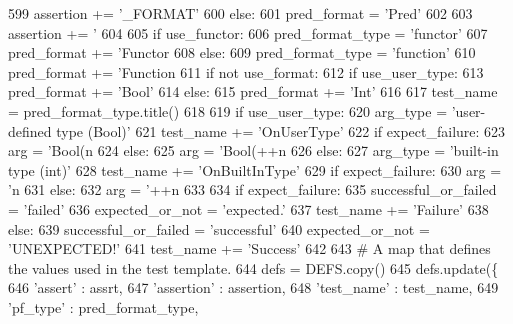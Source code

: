 \begin{DoxyCode}
{{{{{{{{{{{{{{{{{{{{{{{{{{{{{{{{{{{{{{{{{{{{{{{{{599       assertion += \textcolor{stringliteral}{'\_FORMAT'}
600     \textcolor{keywordflow}{else}:
601       pred\_format = \textcolor{stringliteral}{'Pred'}
602 
603     assertion += \textcolor{stringliteral}{'%
604 
605     \textcolor{keywordflow}{if} use\_functor:
606       pred\_format\_type = \textcolor{stringliteral}{'functor'}
607       pred\_format += \textcolor{stringliteral}{'Functor%
608     \textcolor{keywordflow}{else}:
609       pred\_format\_type = \textcolor{stringliteral}{'function'}
610       pred\_format += \textcolor{stringliteral}{'Function%
611       \textcolor{keywordflow}{if} \textcolor{keywordflow}{not} use\_format:
612         \textcolor{keywordflow}{if} use\_user\_type:
613           pred\_format += \textcolor{stringliteral}{'Bool'}
614         \textcolor{keywordflow}{else}:
615           pred\_format += \textcolor{stringliteral}{'Int'}
616 
617     test\_name = pred\_format\_type.title()
618 
619     \textcolor{keywordflow}{if} use\_user\_type:
620       arg\_type = \textcolor{stringliteral}{'user-defined type (Bool)'}
621       test\_name += \textcolor{stringliteral}{'OnUserType'}
622       \textcolor{keywordflow}{if} expect\_failure:
623         arg = \textcolor{stringliteral}{'Bool(n%
624       \textcolor{keywordflow}{else}:
625         arg = \textcolor{stringliteral}{'Bool(++n%
626     \textcolor{keywordflow}{else}:
627       arg\_type = \textcolor{stringliteral}{'built-in type (int)'}
628       test\_name += \textcolor{stringliteral}{'OnBuiltInType'}
629       \textcolor{keywordflow}{if} expect\_failure:
630         arg = \textcolor{stringliteral}{'n%
631       \textcolor{keywordflow}{else}:
632         arg = \textcolor{stringliteral}{'++n%
633 
634     \textcolor{keywordflow}{if} expect\_failure:
635       successful\_or\_failed = \textcolor{stringliteral}{'failed'}
636       expected\_or\_not = \textcolor{stringliteral}{'expected.'}
637       test\_name +=  \textcolor{stringliteral}{'Failure'}
638     \textcolor{keywordflow}{else}:
639       successful\_or\_failed = \textcolor{stringliteral}{'successful'}
640       expected\_or\_not = \textcolor{stringliteral}{'UNEXPECTED!'}
641       test\_name +=  \textcolor{stringliteral}{'Success'}
642 
643     \textcolor{comment}{# A map that defines the values used in the test template.}
644     defs = DEFS.copy()
645     defs.update(\{
646       \textcolor{stringliteral}{'assert'} : assrt,
647       \textcolor{stringliteral}{'assertion'} : assertion,
648       \textcolor{stringliteral}{'test\_name'} : test\_name,
649       \textcolor{stringliteral}{'pf\_type'} : pred\_format\_type,
}}}}}}}}}}}}}}}}}}}}}}}}}}}}}}}}}}}}}}}}}}}}}}}}}}}}}}}}
\end{DoxyCode}
